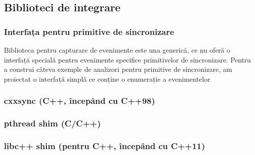 \subsection{Biblioteci de integrare}
\label{integration-libraries}

\subsubsection{Interfața pentru primitive de sincronizare}

Biblioteca pentru capturare de evenimente este una generică, ce nu oferă
o interfață specială pentru evenimente specifice primitivelor de
sincronizare. Pentru a construi câteva exemple de analizori pentru
primitive de sincronizare, am proiectat o interfață simplă ce conține
o enumerație a evenimentelor 

\subsubsection{cxxsync (C++, începând cu C++98)}

\subsubsection{pthread shim (C/C++)}

\subsubsection{libc++ shim (pentru C++, începând cu C++11)}
